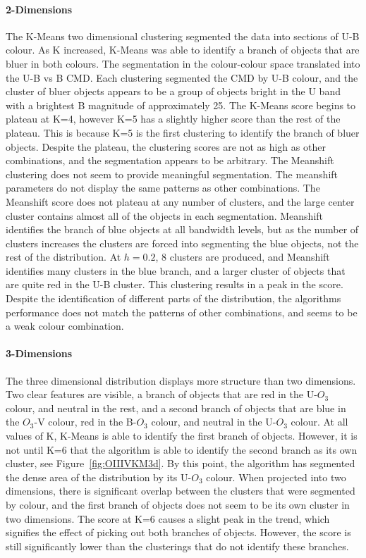 \paragraph{2-Dimensions}
The K-Means two dimensional clustering segmented the data into sections of U-B colour.
As K increased, K-Means was able to identify a branch of objects that are bluer in both colours.
The segmentation in the colour-colour space translated into the U-B vs B CMD. 
Each clustering segmented the CMD by U-B colour, and the cluster of bluer objects appears to be a group of objects bright in the U band with a brightest B magnitude of approximately 25.
The K-Means score begins to plateau at K=4, however K=5 has a slightly higher score than the rest of the plateau. This is because K=5 is the first clustering to identify the branch of bluer objects.
Despite the plateau, the clustering scores are not as high as other combinations, and the segmentation appears to be arbitrary. 
The Meanshift clustering does not seem to provide meaningful segmentation. The meanshift parameters do not display the same patterns as other combinations. 
The Meanshift score does not plateau at any number of clusters, and the large center cluster contains almost all of the objects in each segmentation.
Meanshift identifies the branch of blue objects at all bandwidth levels, but as the number of clusters increases the clusters are forced into segmenting the blue objects, not the rest of the distribution.
At $h=0.2$, 8 clusters are produced, and Meanshift identifies many clusters in the blue branch, and a larger cluster of objects that are quite red in the U-B cluster.
This clustering results in a peak in the score.
Despite the identification of different parts of the distribution, the algorithms performance does not match the patterns of other combinations, and seems to be a weak colour combination. 

\paragraph{3-Dimensions}
The three dimensional distribution displays more structure than two dimensions.
Two clear features are visible, a branch of objects that are red in the U-$O_{3}$ colour, and neutral in the rest, and a second branch of objects that are blue in the $O_{3}$-V colour, red in the B-$O_{3}$ colour, and neutral in the U-$O_{3}$ colour.
At all values of K, K-Means is able to identify the first branch of objects. However, it is not until K=6 that the algorithm is able to identify the second branch as its own cluster, see Figure~\ref{fig:OIIIVKM3d}.
By this point, the algorithm has segmented the dense area of the distribution by its U-$O_{3}$ colour.
When projected into two dimensions, there is significant overlap between the clusters that were segmented by colour, and the first branch of objects does not seem to be its own cluster in two dimensions.
The score at K=6 causes a slight peak in the trend, which signifies the effect of picking out both branches of objects. However, the score is still significantly lower than the clusterings that do not identify these branches.

